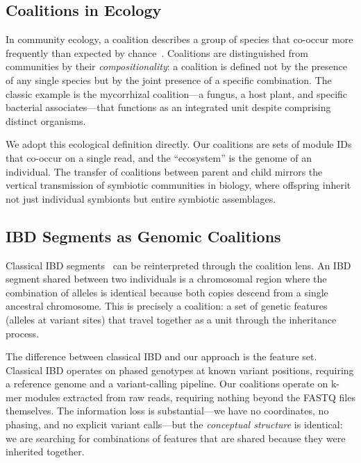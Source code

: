 \documentclass{../yalumba}
\begin{document}
\subsection{Coalitions in Ecology}

In community ecology, a coalition describes a group of species that co-occur
more frequently than expected by chance~\cite{bray1957, morisita1959}.
Coalitions are distinguished from communities by their \emph{compositionality}:
a coalition is defined not by the presence of any single species but by the
joint presence of a specific combination.  The classic example is the
mycorrhizal coalition---a fungus, a host plant, and specific bacterial
associates---that functions as an integrated unit despite comprising distinct
organisms.

We adopt this ecological definition directly.  Our coalitions are sets of
module IDs that co-occur on a single read, and the ``ecosystem'' is the
genome of an individual.  The transfer of coalitions between parent and child
mirrors the vertical transmission of symbiotic communities in biology, where
offspring inherit not just individual symbionts but entire symbiotic
assemblages.

\subsection{IBD Segments as Genomic Coalitions}


Classical IBD segments~\cite{browning2012ibd, browning2013refinedibd} can be
reinterpreted through the coalition lens.  An IBD segment shared between two
individuals is a chromosomal region where the combination of alleles is
identical because both copies descend from a single ancestral chromosome.
This is precisely a coalition: a set of genetic features (alleles at variant
sites) that travel together as a unit through the inheritance process.

The difference between classical IBD and our approach is the feature set.
Classical IBD operates on phased genotypes at known variant positions,
requiring a reference genome and a variant-calling pipeline.  Our coalitions
operate on k-mer modules extracted from raw reads, requiring nothing beyond
the FASTQ files themselves.  The information loss is substantial---we have no
coordinates, no phasing, and no explicit variant calls---but the
\emph{conceptual structure} is identical: we are searching for combinations
of features that are shared because they were inherited together.
\end{document}
